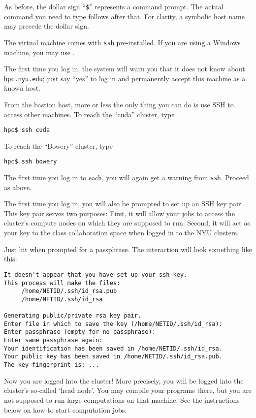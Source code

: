 \documentclass[11pt]{article}
\begin{document}
\begin{note}
As before, the dollar sign ``\texttt{\$}'' represents a
command prompt. The actual command you need to type follows after that. For
clarity, a symbolic host name may precede the dollar sign.
\end{note}

The virtual machine comes with \texttt{ssh} pre-installed.  If you are
using a Windows machine, you may use
.

The first time you log in, the system will warn you that it does not
know about \texttt{hpc.nyu.edu}; just say ``yes'' to log in and
permanently accept this machine as a known host.

From the bastion host, more or less the only thing you can do is use
SSH to access other machines. To reach  the ``cuda'' cluster, type
\begin{lstlisting}
hpc$ ssh cuda
\end{lstlisting}%
To reach the ``Bowery''  cluster, type
\begin{lstlisting}
hpc$ ssh bowery
\end{lstlisting}%
The first time you log in to each, you will again get a warning from
\texttt{ssh}. Proceed as above.

The first time you log in, you will also be prompted to set up an SSH key
pair.  This key pair serves two purposes: First, it will
allow your jobs to access the cluster's compute nodes on which they
are supposed to run. Second, it will act as your key to the class
collaboration space when logged in to the NYU clusters.

Just hit \Enter when prompted for a passphrase. The interaction will
look something like this:

\begin{lstlisting}
It doesn't appear that you have set up your ssh key.
This process will make the files:
     /home/NETID/.ssh/id_rsa.pub
     /home/NETID/.ssh/id_rsa

Generating public/private rsa key pair.
Enter file in which to save the key (/home/NETID/.ssh/id_rsa):
Enter passphrase (empty for no passphrase):
Enter same passphrase again:
Your identification has been saved in /home/NETID/.ssh/id_rsa.
Your public key has been saved in /home/NETID/.ssh/id_rsa.pub.
The key fingerprint is: ...
\end{lstlisting}

Now you are logged into the cluster!  More precisely, you will be
logged into the cluster's so-called `head node'. You may compile your
programs there, but you are not supposed to run large computations on
that machine. See the instructions below on how to start computation
jobs.
\end{document}
